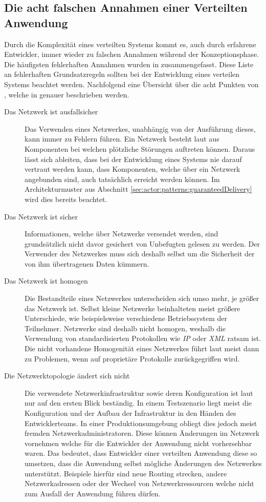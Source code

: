 \subsection{Die acht falschen Annahmen einer Verteilten Anwendung}\label{sec:distributedSystems:wrongAssumptions} 
Durch die Komplexität eines verteilten Systems kommt es, auch durch erfahrene Entwickler, immer wieder zu falschen Annahmen während der Konzeptionsphase. Die häufigsten fehlerhaften Annahmen wurden in \cite{deutsch1994eight} zusammengefasst. Diese Liste an fehlerhaften Grundsatzregeln sollten bei der Entwicklung eines verteilen Systems beachtet werden. Nachfolgend eine Übersicht über die acht Punkten von \cite{deutsch1994eight}, welche in \cite{rotem2006fallacies} genauer beschrieben werden.
\begin{description}
  \item[Das Netzwerk ist ausfallsicher]
  Das Verwenden eines Netzwerkes, unabhängig von der Ausführung dieses, kann immer zu Fehlern führen. Ein Netzwerk besteht laut \cite{rotem2006fallacies} aus Komponenten bei welchen plötzliche Störungen auftreten können. Daraus lässt sich ableiten, dass bei der Entwicklung eines Systems nie darauf vertraut werden kann, dass Komponenten, welche über ein Netzwerk angebunden sind, auch tatsächlich erreicht werden können. Im Architekturmuster aus Abschnitt \ref{sec:actor:patterns:guaranteedDelivery} wird dies bereits beachtet.
  \item[Das Netzwerk ist sicher]
  Informationen, welche über Netzwerke versendet werden, sind grundsätzlich nicht davor gesichert von Unbefugten gelesen zu werden. Der Verwender des Netzwerkes muss sich deshalb selbst um die Sicherheit der von ihm übertragenen Daten kümmern.
  \item[Das Netzwerk ist homogen]
  Die Bestandteile eines Netzwerkes unterscheiden sich umso mehr, je größer das Netzwerk ist. Selbst kleine Netzwerke beinhalteten meist größere Unterschiede, wie beispielsweise verschiedene Betriebssystem der Teilnehmer. Netzwerke sind deshalb nicht homogen, weshalb die Verwendung von standardisierten Protokollen wie \textit{IP} oder \textit{XML} ratsam ist. Die nicht vorhandene Homogenität eines Netzwerkes führt laut \cite{rotem2006fallacies} meist dann zu Problemen, wenn auf proprietäre Protokolle zurückgegriffen wird.
  \item[Die Netzwerktopologie ändert sich nicht]
  Die verwendete Netzwerkinfrastruktur sowie deren Konfiguration ist laut \cite{rotem2006fallacies} nur auf den ersten Blick beständig. In einem Testszenario liegt meist die Konfiguration und der Aufbau der Infrastruktur in den Händen des Entwicklerteams. In einer Produktionsumgebung obliegt dies jedoch meist fremden Netzwerkadministratoren. Diese können Änderungen im Netzwerk vornehmen welche für die Entwickler der Anwendung nicht vorhersehbar waren. Das bedeutet, dass Entwickler einer verteilten Anwendung diese so umsetzen, dass die Anwendung selbst mögliche Änderungen des Netzwerkes unterstützt. Beispiele hierfür sind neue Routing strecken, andere Netzwerkadressen oder der Wechsel von Netzwerkressourcen welche nicht zum Ausfall der Anwendung führen dürfen. 

\end{description}
